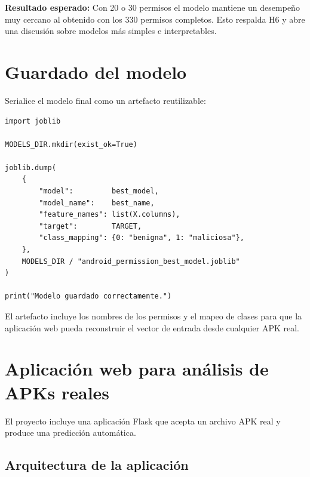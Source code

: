 \documentclass[
  coursetitle={Cómputo Nube y Tecnologías Emergentes},
  coursehours={96},
  coursedate={Verano 2026},
  doctype={Tutorial},
  otherlangs={english,french},
  authorname={Lázaro},
  authorsurname={Bustio-Martínez},
  authortitle={PhD},
  role={Profesor Investigador},
  email={lbustio@inaoe.mx},
  phone={5559504000},
  ext={7459},
  institution={Instituto Nacional de Astrofísica, Óptica y Electrónica (INAOE)},
  department={Maestría en Ciencias en Tecnologías de Seguridad},
  address={Luis Enrique Erro 1, Sta. Ma. Tonantzintla, San Andrés Cholula, CP 72840, Puebla, México},
  margin={0.5in}
]{../../lbustio_lecture_notes}
\begin{document}
\textbf{Resultado esperado:} Con 20 o 30 permisos el modelo mantiene un desempeño muy cercano al obtenido con los 330 permisos completos. Esto respalda H6 y abre una discusión sobre modelos más simples e interpretables.

\section{Guardado del modelo}

Serialice el modelo final como un artefacto reutilizable:

\begin{lstlisting}
import joblib

MODELS_DIR.mkdir(exist_ok=True)

joblib.dump(
    {
        "model":         best_model,
        "model_name":    best_name,
        "feature_names": list(X.columns),
        "target":        TARGET,
        "class_mapping": {0: "benigna", 1: "maliciosa"},
    },
    MODELS_DIR / "android_permission_best_model.joblib"
)

print("Modelo guardado correctamente.")
\end{lstlisting}

El artefacto incluye los nombres de los permisos y el mapeo de clases para que la aplicación web pueda reconstruir el vector de entrada desde cualquier APK real.

\section{Aplicación web para análisis de APKs reales}

El proyecto incluye una aplicación Flask que acepta un archivo APK real y produce una predicción automática.

\subsection{Arquitectura de la aplicación}
\end{document}
